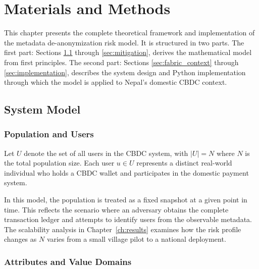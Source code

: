 
\chapter{Materials and Methods}
\label{ch:methodology}

This chapter presents the complete theoretical framework and
implementation of the metadata de-anonymization risk model.
It is structured in two parts. The first part: Sections
\ref{sec:system_model} through \ref{sec:mitigation},
derives the mathematical model from first principles. The
second part: Sections \ref{sec:fabric_context} through
\ref{sec:implementation}, describes the system design and
Python implementation through which the model is applied to
Nepal's domestic CBDC context.

\section{System Model}
\label{sec:system_model}

\subsection{Population and Users}

Let $U$ denote the set of all users in the CBDC system,
with $|U| = N$ where $N$ is the total population size. Each
user $u \in U$ represents a distinct real-world individual
who holds a CBDC wallet and participates in the domestic
payment system.

In this model, the population is treated as a fixed snapshot
at a given point in time. This reflects the scenario where
an adversary obtains the complete transaction ledger and
attempts to identify users from the observable metadata.
The scalability analysis in Chapter~\ref{ch:results}
examines how the risk profile changes as $N$ varies from
a small village pilot to a national deployment.

\subsection{Attributes and Value Domains}

